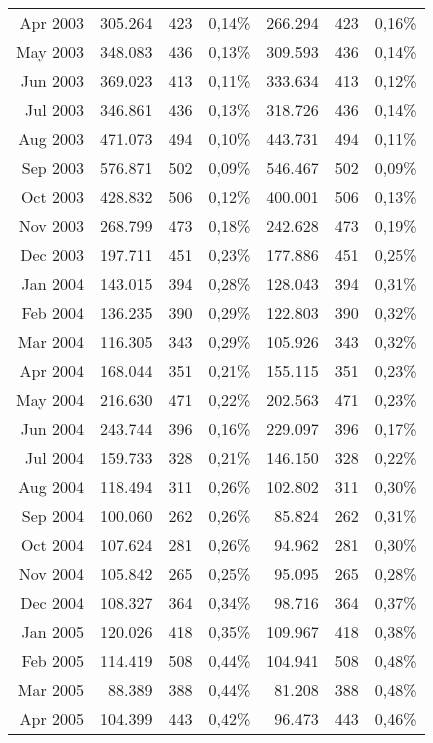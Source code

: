 \begin{longtable}{r|rrr|rrr}
Apr 2003 & 305.264 & 423   & 0,14\% & 266.294 & 423   & 0,16\% \\
May 2003 & 348.083 & 436   & 0,13\% & 309.593 & 436   & 0,14\% \\
Jun 2003 & 369.023 & 413   & 0,11\% & 333.634 & 413   & 0,12\% \\
Jul 2003 & 346.861 & 436   & 0,13\% & 318.726 & 436   & 0,14\% \\
Aug 2003 & 471.073 & 494   & 0,10\% & 443.731 & 494   & 0,11\% \\
Sep 2003 & 576.871 & 502   & 0,09\% & 546.467 & 502   & 0,09\% \\
Oct 2003 & 428.832 & 506   & 0,12\% & 400.001 & 506   & 0,13\% \\
Nov 2003 & 268.799 & 473   & 0,18\% & 242.628 & 473   & 0,19\% \\
Dec 2003 & 197.711 & 451   & 0,23\% & 177.886 & 451   & 0,25\% \\
Jan 2004 & 143.015 & 394   & 0,28\% & 128.043 & 394   & 0,31\% \\
Feb 2004 & 136.235 & 390   & 0,29\% & 122.803 & 390   & 0,32\% \\
Mar 2004 & 116.305 & 343   & 0,29\% & 105.926 & 343   & 0,32\% \\
Apr 2004 & 168.044 & 351   & 0,21\% & 155.115 & 351   & 0,23\% \\
May 2004 & 216.630 & 471   & 0,22\% & 202.563 & 471   & 0,23\% \\
Jun 2004 & 243.744 & 396   & 0,16\% & 229.097 & 396   & 0,17\% \\
Jul 2004 & 159.733 & 328   & 0,21\% & 146.150 & 328   & 0,22\% \\
Aug 2004 & 118.494 & 311   & 0,26\% & 102.802 & 311   & 0,30\% \\
Sep 2004 & 100.060 & 262   & 0,26\% & 85.824  & 262   & 0,31\% \\
Oct 2004 & 107.624 & 281   & 0,26\% & 94.962  & 281   & 0,30\% \\
Nov 2004 & 105.842 & 265   & 0,25\% & 95.095  & 265   & 0,28\% \\
Dec 2004 & 108.327 & 364   & 0,34\% & 98.716  & 364   & 0,37\% \\
Jan 2005 & 120.026 & 418   & 0,35\% & 109.967 & 418   & 0,38\% \\
Feb 2005 & 114.419 & 508   & 0,44\% & 104.941 & 508   & 0,48\% \\
Mar 2005 & 88.389  & 388   & 0,44\% & 81.208  & 388   & 0,48\% \\
Apr 2005 & 104.399 & 443   & 0,42\% & 96.473  & 443   & 0,46\% \\

\end{longtable}
